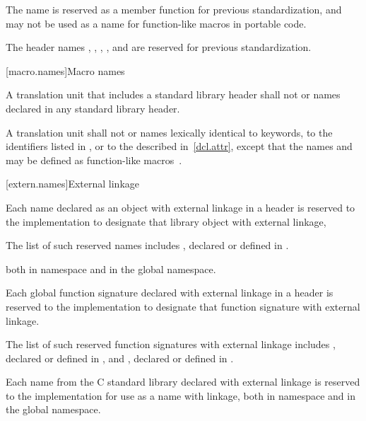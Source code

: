 \pnum
The name   is reserved as a
member function for previous standardization, and may not be used as a name for
function-like macros in portable code.

\pnum
The header names
,
,
,
, and
are reserved for previous standardization.

[macro.names]{Macro names}

\pnum
{}%
%
A translation unit that includes a standard library header shall not
 or  names declared in any standard
library header.

\pnum
{}%
A translation unit shall not  or 
names lexically identical
to keywords,
to the identifiers listed in , or
to the  described in~\ref{dcl.attr},
except that the names  and  may be
defined as function-like macros~.

[extern.names]{External linkage}

\pnum
Each name declared as an object with external linkage
%
in a header is reserved to the implementation to designate that library
object with external linkage,%
%
\begin{footnote}
The list of such reserved names includes
, declared or defined in .
\end{footnote}
both in namespace  and in the global namespace.

\pnum
Each
%
global function signature declared with
%
external linkage in a header is reserved to the
implementation to designate that function signature with
%
external linkage.%
\begin{footnote}
The list of such reserved function
signatures with external linkage includes
%
,
declared or defined in ,
and
%
%
,
declared or defined in
.
\end{footnote}

\pnum
Each name from the C standard library declared with external linkage
%
is reserved to the implementation for use as a name with
%
%
linkage,
both in namespace  and in the global namespace.

